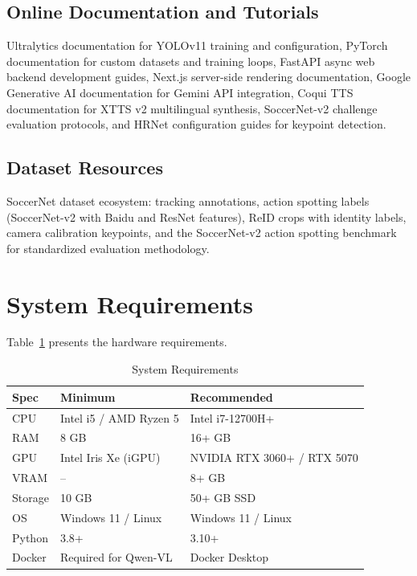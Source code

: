 \documentclass[10pt,twocolumn,a4paper]{article}
\begin{document}
\subsection{Online Documentation and Tutorials}

Ultralytics documentation for YOLOv11 training and configuration, PyTorch documentation for custom datasets and training loops, FastAPI async web backend development guides, Next.js server-side rendering documentation, Google Generative AI documentation for Gemini API integration, Coqui TTS documentation for XTTS v2 multilingual synthesis, SoccerNet-v2 challenge evaluation protocols, and HRNet configuration guides for keypoint detection.

\subsection{Dataset Resources}

SoccerNet dataset ecosystem: tracking annotations, action spotting labels (SoccerNet-v2 with Baidu and ResNet features), ReID crops with identity labels, camera calibration keypoints, and the SoccerNet-v2 action spotting benchmark for standardized evaluation methodology.

\section{System Requirements}

Table~\ref{tab:sysreq} presents the hardware requirements.

\begin{table}[H]
\centering
\caption{System Requirements}
\label{tab:sysreq}
\scriptsize
\begin{tabularx}{\columnwidth}{l X X}
\toprule
\textbf{Spec} & \textbf{Minimum} & \textbf{Recommended} \\
\midrule
CPU & Intel i5 / AMD Ryzen 5 & Intel i7-12700H+ \\
RAM & 8 GB & 16+ GB \\
GPU & Intel Iris Xe (iGPU) & NVIDIA RTX 3060+ / RTX 5070 \\
VRAM & -- & 8+ GB \\
Storage & 10 GB & 50+ GB SSD \\
OS & Windows 11 / Linux & Windows 11 / Linux \\
Python & 3.8+ & 3.10+ \\
Docker & Required for Qwen-VL & Docker Desktop \\
\bottomrule
\end{tabularx}
\end{table}
\end{document}
